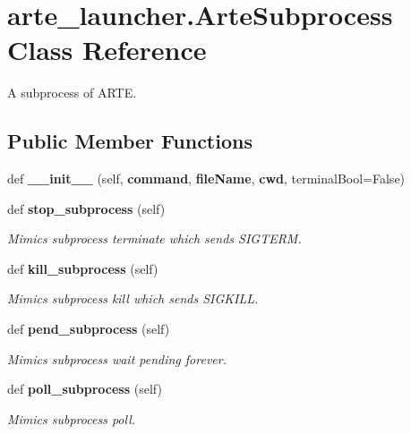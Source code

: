 \section{arte\+\_\+launcher.\+Arte\+Subprocess Class Reference}
\label{classarte__launcher_1_1_arte_subprocess}


A subprocess of A\+R\+TE.  


\subsection*{Public Member Functions}
\begin{DoxyCompactItemize}
\item 
def {\bfseries \+\_\+\+\_\+init\+\_\+\+\_\+} (self, {\bf command}, {\bf file\+Name}, {\bf cwd}, terminal\+Bool=False)\label{classarte__launcher_1_1_arte_subprocess_a924f9ab8a4ede522aa7cc20b3fc8d9bb}

\item 
def {\bf stop\+\_\+subprocess} (self)
\begin{DoxyCompactList}\small\item\em Mimics subprocess terminate which sends S\+I\+G\+T\+E\+RM. \end{DoxyCompactList}\item 
def {\bf kill\+\_\+subprocess} (self)
\begin{DoxyCompactList}\small\item\em Mimics subprocess kill which sends S\+I\+G\+K\+I\+LL. \end{DoxyCompactList}\item 
def {\bf pend\+\_\+subprocess} (self)
\begin{DoxyCompactList}\small\item\em Mimics subprocess wait pending forever. \end{DoxyCompactList}\item 
def {\bf poll\+\_\+subprocess} (self)
\begin{DoxyCompactList}\small\item\em Mimics subprocess poll. \end{DoxyCompactList}\end{DoxyCompactItemize}
